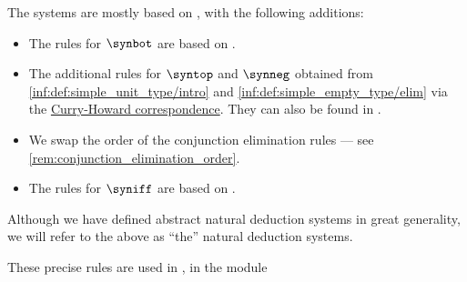 \begin{comments}
  \item The systems are mostly based on \cite[def. 2.1.1]{TroelstraSchwichtenberg2000BasicProofTheory}, with the following additions:
  \begin{itemize}
    \item The rules for \( \synbot \) are based on \cite[31]{VanDalen2004LogicAndStructure}.

    \item The additional rules for \( \syntop \) and \( \synneg \) obtained from \ref{inf:def:simple_unit_type/intro} and \ref{inf:def:simple_empty_type/elim} via the \hyperref[con:curry_howard_correspondence]{Curry-Howard correspondence}. They can also be found in \cite[fig. 2.5]{Mimram2020ProgramEqualsProof}.

    \item We swap the order of the conjunction elimination rules --- see \cref{rem:conjunction_elimination_order}.

    \item The rules for \( \syniff \) are based on \cite[99]{КолмогоровДрагалин2006ЛогикаВведение}.
  \end{itemize}

  \item Although we have defined abstract natural deduction systems in great generality, we will refer to the above as \enquote{the} natural deduction systems.

  \item These precise rules are used in \cite{notebook:code}, in the module
  \begin{CodeRefDisplay}
  \end{CodeRefDisplay}
\end{comments}

